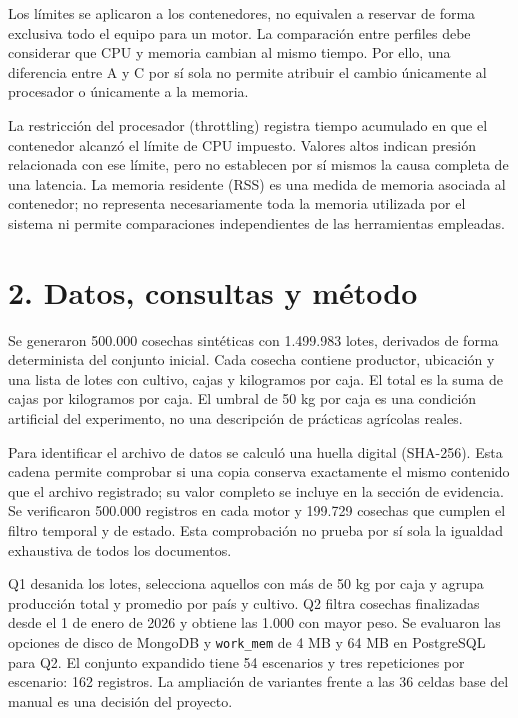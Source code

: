 \documentclass[12pt,letterpaper]{article}
\begin{document}
Los límites se aplicaron a los contenedores, no equivalen a reservar de forma exclusiva todo el equipo para un motor. La comparación entre perfiles debe considerar que CPU y memoria cambian al mismo tiempo. Por ello, una diferencia entre A y C por sí sola no permite atribuir el cambio únicamente al procesador o únicamente a la memoria.

La restricción del procesador (throttling) registra tiempo acumulado en que el contenedor alcanzó el límite de CPU impuesto. Valores altos indican presión relacionada con ese límite, pero no establecen por sí mismos la causa completa de una latencia. La memoria residente (RSS) es una medida de memoria asociada al contenedor; no representa necesariamente toda la memoria utilizada por el sistema ni permite comparaciones independientes de las herramientas empleadas.

\section*{2. Datos, consultas y método}
Se generaron 500.000 cosechas sintéticas con 1.499.983 lotes, derivados de forma determinista del conjunto inicial. Cada cosecha contiene productor, ubicación y una lista de lotes con cultivo, cajas y kilogramos por caja. El total es la suma de cajas por kilogramos por caja. El umbral de 50 kg por caja es una condición artificial del experimento, no una descripción de prácticas agrícolas reales.

Para identificar el archivo de datos se calculó una huella digital (SHA-256). Esta cadena permite comprobar si una copia conserva exactamente el mismo contenido que el archivo registrado; su valor completo se incluye en la sección de evidencia. Se verificaron 500.000 registros en cada motor y 199.729 cosechas que cumplen el filtro temporal y de estado. Esta comprobación no prueba por sí sola la igualdad exhaustiva de todos los documentos.

Q1 desanida los lotes, selecciona aquellos con más de 50 kg por caja y agrupa producción total y promedio por país y cultivo. Q2 filtra cosechas finalizadas desde el 1 de enero de 2026 y obtiene las 1.000 con mayor peso. Se evaluaron las opciones de disco de MongoDB y \texttt{work\_\allowbreak{}mem} de 4 MB y 64 MB en PostgreSQL para Q2. El conjunto expandido tiene 54 escenarios y tres repeticiones por escenario: 162 registros. La ampliación de variantes frente a las 36 celdas base del manual es una decisión del proyecto.
\end{document}
